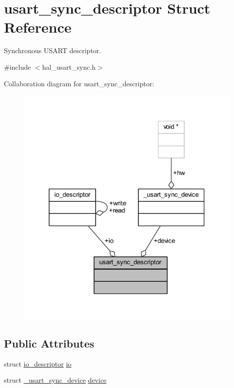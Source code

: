 \hypertarget{structusart__sync__descriptor}{}\section{usart\+\_\+sync\+\_\+descriptor Struct Reference}
\label{structusart__sync__descriptor}


Synchronous U\+S\+A\+RT descriptor.  




{\ttfamily \#include $<$hal\+\_\+usart\+\_\+sync.\+h$>$}



Collaboration diagram for usart\+\_\+sync\+\_\+descriptor\+:\nopagebreak
\begin{figure}[H]
\begin{center}
\leavevmode
\includegraphics[width=320pt]{structusart__sync__descriptor__coll__graph}
\end{center}
\end{figure}
\subsection*{Public Attributes}
\begin{DoxyCompactItemize}
\item 
struct \hyperlink{structio__descriptor}{io\+\_\+descriptor} \hyperlink{structusart__sync__descriptor_a9ef5dd1d1c2010fc961d3e803c7429cb}{io}
\item 
struct \hyperlink{struct__usart__sync__device}{\+\_\+usart\+\_\+sync\+\_\+device} \hyperlink{structusart__sync__descriptor_a825cfcdd7f23413952a2a198b8a07ad5}{device}
\end{DoxyCompactItemize}


